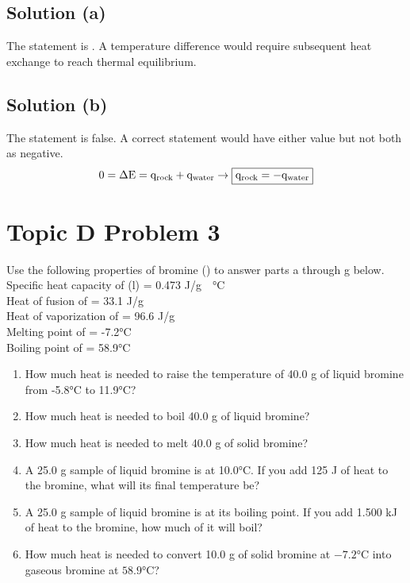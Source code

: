 \documentclass[10pt]{article}
\begin{document}
        \subsection{Solution (a)}
            The statement is . 
            A temperature difference would require subsequent heat exchange to reach thermal equilibrium.

        \subsection{Solution (b)}
            The statement is false. 
            A correct statement would have either value but not both as negative.
            \begin{gather}
                \rm 0 = \Delta E = q_{rock} + q_{water} \to \boxed{\rm q_{rock} = -q_{water}}
            \end{gather}

    \pagebreak
    \section{Topic D Problem 3}
        Use the following properties of bromine () to answer parts a through g below.\\
            Specific heat capacity of (l) = 0.473 \unit{\joule/\gram\cdot\celsius}\\
            Heat of fusion of  = 33.1 J/g\\
            Heat of vaporization of  = 96.6 J/g\\
            Melting point of  = -7.2\unit{\celsius}\\
            Boiling point of  = 58.9\unit{\celsius}
        
        \begin{enumerate}[label=\alph*)]
            \item How much heat is needed to raise the temperature of 40.0 g of liquid bromine from -5.8\unit{\celsius} to 11.9\unit{\celsius}?
            \item How much heat is needed to boil 40.0 g of liquid bromine?
            \item How much heat is needed to melt 40.0 g of solid bromine?
            \item A 25.0 g sample of liquid bromine is at 10.0\unit{\celsius}. If you add 125 J of heat to the bromine, what will its final temperature be?
            \item A 25.0 g sample of liquid bromine is at its boiling point. If you add 1.500 kJ of heat to the bromine, how much of it will boil?
            \item How much heat is needed to convert 10.0 g of solid bromine at $-7.2\unit{\celsius}$ into gaseous bromine at $58.9\unit{\celsius}$?
        \end{enumerate}
\end{document}
